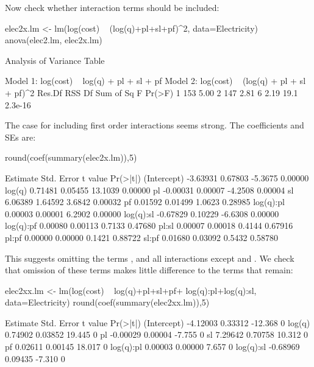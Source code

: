 Now check whether interaction terms should be included:
\begin{Schunk}
\begin{Sinput}
elec2x.lm <- lm(log(cost) ~ (log(q)+pl+sl+pf)^2,
                data=Electricity)
anova(elec2.lm, elec2x.lm)
\end{Sinput}
\begin{Soutput}
Analysis of Variance Table

Model 1: log(cost) ~ log(q) + pl + sl + pf
Model 2: log(cost) ~ (log(q) + pl + sl + pf)^2
  Res.Df  RSS Df Sum of Sq    F  Pr(>F)
1    153 5.00                          
2    147 2.81  6      2.19 19.1 2.3e-16
\end{Soutput}
\end{Schunk}
The case for including first order interactions seems strong. The
coefficients and SEs are:
\begin{Schunk}
\begin{Sinput}
round(coef(summary(elec2x.lm)),5)
\end{Sinput}
\begin{Soutput}
            Estimate Std. Error t value Pr(>|t|)
(Intercept) -3.63931    0.67803 -5.3675  0.00000
log(q)       0.71481    0.05455 13.1039  0.00000
pl          -0.00031    0.00007 -4.2508  0.00004
sl           6.06389    1.64592  3.6842  0.00032
pf           0.01592    0.01499  1.0623  0.28985
log(q):pl    0.00003    0.00001  6.2902  0.00000
log(q):sl   -0.67829    0.10229 -6.6308  0.00000
log(q):pf    0.00080    0.00113  0.7133  0.47680
pl:sl        0.00007    0.00018  0.4144  0.67916
pl:pf        0.00000    0.00000  0.1421  0.88722
sl:pf        0.01680    0.03092  0.5432  0.58780
\end{Soutput}
\end{Schunk}
This suggests omitting the terms , and all interactions
except  and .  We check that omission
of these terms makes little difference to the terms that remain:
\begin{Schunk}
\begin{Sinput}
elec2xx.lm <- lm(log(cost) ~ log(q)+pl+sl+pf+
                 log(q):pl+log(q):sl,
                 data=Electricity)
round(coef(summary(elec2xx.lm)),5)
\end{Sinput}
\begin{Soutput}
            Estimate Std. Error t value Pr(>|t|)
(Intercept) -4.12003    0.33312 -12.368        0
log(q)       0.74902    0.03852  19.445        0
pl          -0.00029    0.00004  -7.755        0
sl           7.29642    0.70758  10.312        0
pf           0.02611    0.00145  18.017        0
log(q):pl    0.00003    0.00000   7.657        0
log(q):sl   -0.68969    0.09435  -7.310        0
\end{Soutput}
\end{Schunk}

